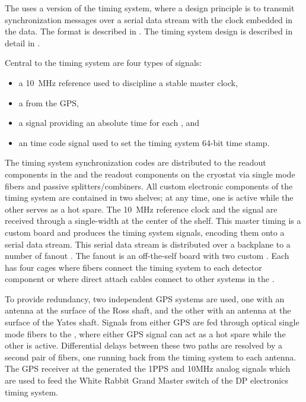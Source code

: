 The   uses a version of the  timing
system, where a design principle is to transmit synchronization messages over a
serial data stream with the clock embedded in the data. The format is described
in . The timing system design is described in detail in
.

Central to the timing system are four types of signals:
\begin{itemize}
\item a \SI{10}{\mega\hertz} reference used to discipline a stable master clock,
\item a  from the GPS,
\item a  signal providing an absolute time for each , and
\item an  time code signal
  used to set the timing system 64-bit time stamp.
\end{itemize}

The timing system synchronization codes are distributed to the 
readout components in the  and the readout components on the
cryostat via single mode fibers and passive splitters/combiners.
All custom electronic components of the timing system are contained in two
 shelves; at any time, one is active while the other serves as a hot
spare.
The \SI{10}{MHz} reference clock and the  signal are received through
a single-width  at the center of the  shelf.
This master timing  is a custom board and produces the timing system
signals, encoding them onto a serial data stream.
This serial data stream is distributed over a backplane to a number of fanout
.
The fanout  is an off-the-self board with two custom .
Each  has four  cages where fibers connect the timing
system to each detector component or where direct attach
cables connect to other systems in the .

To provide redundancy, two independent GPS systems are used, one with an antenna
at the surface of the Ross shaft, and the other with an antenna at the surface
of the Yates shaft.
Signals from either GPS are fed through optical single mode fibers to the
, where either GPS signal can act as a hot spare while the other is
active. 
Differential delays between these two paths are resolved by a second pair of
fibers, one running back from the timing system to each antenna.
The GPS receiver at the   generated the 1PPS and 10MHz analog signals which are used to feed
the White Rabbit Grand Master switch of the DP electronics timing system.



